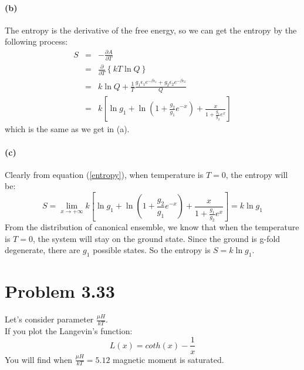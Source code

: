 \documentclass{article}
\begin{document}
	\paragraph{(b)}
	The entropy is the derivative of the free energy, so we can get the entropy by the following process:
	\begin{eqnarray}
	S &=& -\frac{\partial A}{\partial T}\nonumber\\
	&=&\frac{\partial}{\partial T}\left\{kT\ln Q\right\}\nonumber\\
	&=&k\ln Q +\frac{1}{T}\frac{g_1\epsilon_1e^{-\beta\epsilon_1}+g_2\epsilon_2e^{-\beta\epsilon_2}}{Q}\nonumber\\
	&=&k\left[\ln g_1 + \ln\left(1+\frac{g_2}{g_1}e^{-x}\right)+\frac{x}{1+\frac{g_1}{g_2}e^x}\right]
	\end{eqnarray}
	which is the same as we get in (a).
	\paragraph{(c)}
	Clearly from equation (\ref{entropy}), when temperature is $T=0$, the entropy will be:
	\begin{equation}
	S = \lim_{x\rightarrow +\infty}k\left[\ln g_1 + \ln\left(1+\frac{g_2}{g_1}e^{-x}\right)+\frac{x}{1+\frac{g_1}{g_2}e^x}\right]=k\ln g_1
	\end{equation}
	From the distribution of canonical ensemble, we know that when the temperature is $T=0$, the system will stay on the ground state. Since the ground is g-fold degenerate, there are $g_1$ possible states. So the entropy is $S = k\ln g_1$.


\section*{Problem 3.33} %
\label{sec:problem_3_33}
	Let's consider parameter $\frac{\mu H}{kT}$.\\
	If you plot the Langevin's function:
	$$L(x)=coth(x)-\frac{1}{x}$$ 
	You will find when $\frac{\mu H}{kT}=5.12$ magnetic moment is saturated.\\
\end{document}
